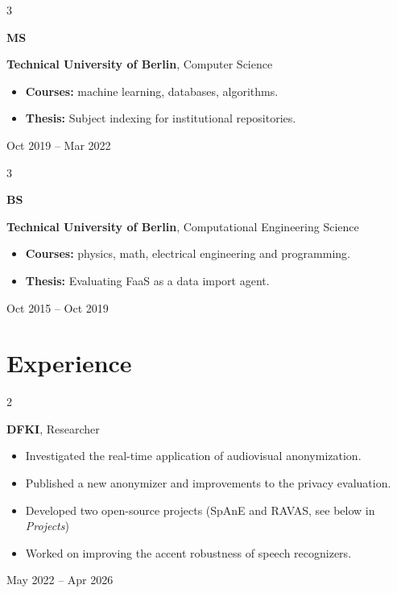 \documentclass[10pt, letterpaper]{article}
\newenvironment{highlights}{
    \begin{itemize}[
        topsep=0.10 cm,
        parsep=0.10 cm,
        partopsep=0pt,
        itemsep=0pt,
        leftmargin=0.4 cm + 10pt
    ]
}{
    \end{itemize}
} %
\newenvironment{twocolentry}[2][]{
    \onecolentry
    \def\secondColumn{#2}
    \setcolumnwidth{\fill, 4.5 cm}
    \begin{paracol}{2}
}{
    \switchcolumn \raggedleft \secondColumn
    \end{paracol}
    \endonecolentry
} %
\newenvironment{threecolentry}[3][]{
    \onecolentry
    \def\thirdColumn{#3}
    \setcolumnwidth{1 cm, \fill, 4.5 cm}
    \begin{paracol}{3}
    {\raggedright #2} \switchcolumn
}{
    \switchcolumn \raggedleft \thirdColumn
    \end{paracol}
    \endonecolentry
} %
\begin{document}
        \begin{threecolentry}{\textbf{MS}}{
            Oct 2019 – Mar 2022
        }
            \textbf{Technical University of Berlin}, Computer Science
            \begin{highlights}
                \item \textbf{Courses:} machine learning, databases, algorithms.
                \item \textbf{Thesis:} Subject indexing for institutional repositories.
            \end{highlights}
        \end{threecolentry}

        \begin{threecolentry}{\textbf{BS}}{
            Oct 2015 – Oct 2019
        }
            \textbf{Technical University of Berlin}, Computational Engineering Science
            \begin{highlights}
                \item \textbf{Courses:} physics, math, electrical engineering and programming.
                \item \textbf{Thesis:} Evaluating FaaS as a data import agent.
            \end{highlights}
        \end{threecolentry}
    
    \section{Experience}
   
        \begin{twocolentry}{
            May 2022 – Apr 2026
        }
            \textbf{DFKI}, Researcher
            \begin{highlights}
                \item Investigated the real-time application of audiovisual anonymization.
                \item Published a new anonymizer and improvements to the privacy evaluation.
                \item Developed two open-source projects (SpAnE and RAVAS, see below in \textit{Projects}) 
                \item Worked on improving the accent robustness of speech recognizers.
            \end{highlights}
        \end{twocolentry}

        \vspace{0.1 cm}
\end{document}
